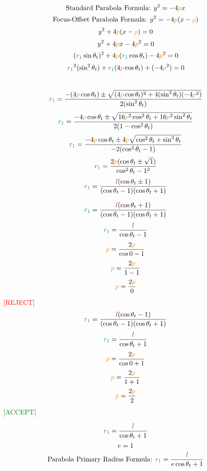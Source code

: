 $$\text{Standard Parabola Formula: }  y^2=-4\textcolor{orange}{p}x$$
$$\text{Focus-Offset Parabola Formula: } y^2=-4\textcolor{orange}{p}(x-\textcolor{orange}{p})$$
$$y^2+4\textcolor{orange}{p}(x-\textcolor{orange}{p})=0$$
$$y^2+4\textcolor{orange}{p}x-4\textcolor{orange}{p}^2=0$$
$$(\textcolor{teal}{r_1}\sin{\textcolor{black}{\theta_t}})^2+4\textcolor{orange}{p}(\textcolor{teal}{r_1}\cos{\textcolor{black}{\theta_t}})-4\textcolor{orange}{p}^2=0$$
$$\textcolor{teal}{r_1}^2(\sin^2{\textcolor{black}{\theta_t}})+\textcolor{teal}{r_1}(4\textcolor{orange}{p}\cos{\textcolor{black}{\theta_t}})+(-4\textcolor{orange}{p}^2)=0$$
\\
$$\textcolor{teal}{r_1} = \frac
{-(4\textcolor{orange}{p}\cos{\textcolor{black}{\theta_t}}) \pm \sqrt{(4\textcolor{orange}{p}\cos{\textcolor{black}{\theta_t}})^2 + 4(\sin^2{\textcolor{black}{\theta_t}})(-4\textcolor{orange}{p}^2)}}
{2(\sin^2{\textcolor{black}{\theta_t}})}$$
$$\textcolor{teal}{r_1} = \frac
{-4\textcolor{orange}{p}\cos{\textcolor{black}{\theta_t}} \pm \sqrt{16\textcolor{orange}{p}^2\cos^2{\textcolor{black}{\theta_t}} + 16\textcolor{orange}{p}^2\sin^2{\textcolor{black}{\theta_t}}}}
{2(1-\cos^2{\textcolor{black}{\theta_t}})}$$
$$\textcolor{teal}{r_1} = \frac
{-4\textcolor{orange}{p}\cos{\textcolor{black}{\theta_t}} \pm 4\textcolor{orange}{p}\sqrt{\cos^2{\textcolor{black}{\theta_t}} + \sin^2{\textcolor{black}{\theta_t}}}}
{-2(\cos^2{\textcolor{black}{\theta_t}}-1)}$$
$$\textcolor{teal}{r_1} = \frac
{2\textcolor{orange}{p}(\cos{\textcolor{black}{\theta_t}} \pm \sqrt{1})}
{\cos^2{\textcolor{black}{\theta_t}}-1^2}$$
$$\textcolor{teal}{r_1} = \frac
{\textcolor{purple}{l}(\cos{\textcolor{black}{\theta_t}} \pm 1)}
{(\cos{\textcolor{black}{\theta_t}}-1)(\cos{\textcolor{black}{\theta_t}}+1)}$$

\bigskip
\begin{multicols}{2}
\flushcolumns
\noindent
$$\textcolor{teal}{r_1} = \frac{\textcolor{purple}{l}(\cos{\textcolor{black}{\theta_t}} + 1)}{(\cos{\textcolor{black}{\theta_t}} - 1)(\cos{\textcolor{black}{\theta_t}} + 1)}$$
$$\textcolor{teal}{r_1} = \frac{\textcolor{purple}{l}}{\cos{\textcolor{black}{\theta_t}} - 1}$$
$$\textcolor{orange}{p} = \frac{2\textcolor{orange}{p}}{\cos{0} - 1}$$
$$\textcolor{orange}{p} = \frac{2\textcolor{orange}{p}}{1 - 1}$$
$$\textcolor{orange}{p} = \frac{2\textcolor{orange}{p}}{0}$$
\centering
\textcolor{red}{[REJECT]}
\columnbreak
\bigskip
$$\textcolor{teal}{r_1} = \frac{\textcolor{purple}{l}(\cos{\textcolor{black}{\theta_t}} - 1)}{(\cos{\textcolor{black}{\theta_t}} - 1)(\cos{\textcolor{black}{\theta_t}} + 1)}$$
$$\textcolor{teal}{r_1} = \frac{\textcolor{purple}{l}}{\cos{\textcolor{black}{\theta_t}} + 1}$$
$$\textcolor{orange}{p} = \frac{2\textcolor{orange}{p}}{\cos{0} + 1}$$
$$\textcolor{orange}{p} = \frac{2\textcolor{orange}{p}}{1 + 1}$$
$$\textcolor{orange}{p} = \frac{2\textcolor{orange}{p}}{2}$$
\centering
\textcolor{green}{[ACCEPT]}
\end{multicols}

\centering
$$\textcolor{teal}{r_1} = \frac{\textcolor{purple}{l}}{\cos{\textcolor{black}{\theta_t}} + 1}$$
$$\textcolor{black}{e} = 1$$
$$\text{Parabola Primary Radius Formula: }\textcolor{teal}{r_1} = \frac{\textcolor{purple}{l}}{\textcolor{black}{e}\cos{\textcolor{black}{\theta_t}} + 1}$$